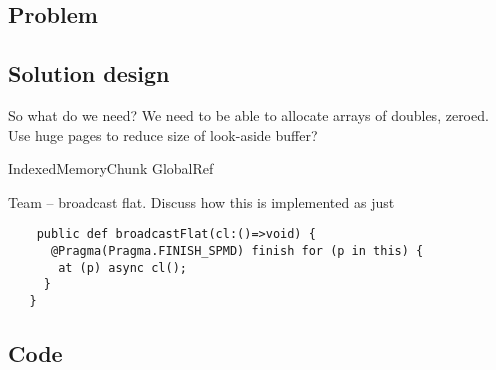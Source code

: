 \subsection{Problem}
\subsection{Solution design} 
    So what do we need? We need to be able to allocate arrays of
    doubles, zeroed. Use huge pages to reduce size of look-aside
    buffer? 

    IndexedMemoryChunk
    GlobalRef

    Team -- broadcast flat. 
    Discuss how this is implemented as just

{\footnotesize
\begin{verbatim}
    public def broadcastFlat(cl:()=>void) {
      @Pragma(Pragma.FINISH_SPMD) finish for (p in this) {
       at (p) async cl();
     }
   }
\end{verbatim}}
\subsection{Code} 

